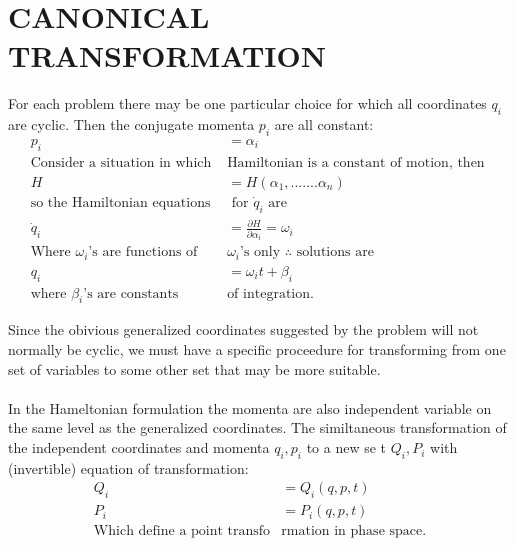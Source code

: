 \chapter{CANONICAL TRANSFORMATION}
For each problem there may be one particular choice for which all coordinates $q_i$ are cyclic. Then the conjugate momenta $p_i$ are all constant:
\begin{align*}
p_i&=\alpha_i\\
\text{Consider a situation in which }&\text{Hamiltonian is a constant of motion,
	then }\\
H&=H(\alpha_1,.......\alpha_n)\\
\text{so the Hamiltonian equations}&\text{ for $\dot{q}_i$ are }\\
\dot{q}_i&=\frac{\partial H}{\partial \alpha_i}=\omega_i\\
\text{Where $\omega_i$'s are functions of  }&\text{$\omega_i$'s only	$\therefore $ solutions are}\\
 q_i&=\omega_i t+\beta_i\\
 \text{where $\beta_i$'s are constants }&\text{of integration.}
\end{align*}
\par Since the obivious generalized coordinates suggested by the problem will
not normally be cyclic, we must have a specific proceedure for transforming from one set of variables to some other set that may be more suitable.\\\\
 In the Hameltonian formulation the momenta are also independent variable on the same level as the generalized coordinates. The similtaneous transformation of the independent coordinates and momenta $q_i,p_i$ to a new se t  $Q_i,P_i$ with (invertible) equation of transformation:
 \begin{align*}
 Q_i&=Q_i (q,p,t)\\
 P_i&=P_i (q,p,t)\\
 \text{Which define a point transfo}&\text{rmation in phase space.}
 \end{align*}
